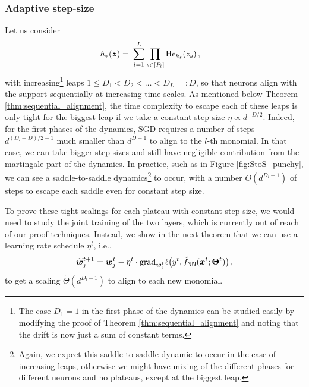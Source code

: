\documentclass[11pt]{article}
\newcommand{\<}{\langle}
\renewcommand{\>}{\rangle}
\theoremstyle{definition}
\def\bw{{\boldsymbol w}}
\def\bx{{\boldsymbol x}}
\def\bz{{\boldsymbol z}}
\def\bTheta{{\boldsymbol \Theta}}
\def\hf{{\hat f}}
\def\NN{{\sf NN}}
\def\NN{{\sf NN}}
\def\bz{{\boldsymbol z}}
\def\He{{\rm He}}
\def\bTheta{{\boldsymbol \Theta}}
\def\NN{{\sf NN}}
\def\bw{{\boldsymbol w}}
\def\bx{{\boldsymbol x}}
\def\bz{{\boldsymbol z}}
\def\He{{\rm He}}
\def\bTheta{{\boldsymbol \Theta}}
\def\hf{\hat f}
\def\tbw{\widetilde \bw}
\def\grad{\text{grad}}
\def\tbw{\widetilde{\bw}}
\begin{document}
\subsubsection{Adaptive step-size}
\label{sec:adaptive_step_size}

Let us consider 
\begin{equation}\label{eq:nested_monomials_increasingleap}
\begin{aligned}
h_* (\bz) =&~ \sum_{l = 1}^L \prod_{s \in [P_l]} \He_{k_s} (z_s) \, ,
\end{aligned}
\end{equation}
with increasing\footnote{The case $D_1 = 1$ in the first phase of the dynamics can be studied easily by modifying the proof of Theorem \ref{thm:sequential_alignment} and noting that the 
drift is now just a sum of constant terms.} leaps $1 \leq D_1 < D_2 < \ldots < D_L =: D$, so that neurons align with the support sequentially at increasing time scales. As mentioned below Theorem \ref{thm:sequential_alignment}, the time complexity to escape each of these leaps is only tight for the biggest leap if we take a constant step size $\eta \propto d^{-D/2}$. Indeed, for the first phases of the dynamics, SGD requires a number of steps $d^{(D_l+D)/2 - 1}$ much smaller than $d^{D-1}$ to align to the $l$-th monomial. In that case, we can take bigger step sizes and still have negligible contribution from the martingale part of the dynamics. In practice, such as in Figure \ref{fig:StoS_punchy}, we can see a saddle-to-saddle dynamics\footnote{Again, we expect this saddle-to-saddle dynamic to occur in the case of increasing leaps, otherwise we might have mixing of the different phases for different neurons and no plateaus, except at the biggest leap.} to occur, with a number $O(d^{D_l - 1})$ of steps to escape each saddle even for constant step size. 

To prove these tight scalings for each plateau with constant step size, we would need to study the joint training of the two layers, which is currently out of reach of our proof techniques. Instead, we show in the next theorem that we can use a learning rate schedule $\eta^t$, i.e.,
\[
\tbw_j^{t+1} = \bw_j^t - \eta^t \cdot \grad_{\bw_j^t} \ell \big( y^t , \hf_{\NN} (\bx^t ; \bTheta^t ) \big)\, ,
\]
to get a scaling $\widetilde{\Theta} (d^{D_l -1})$ to align to each new monomial.
\end{document}
